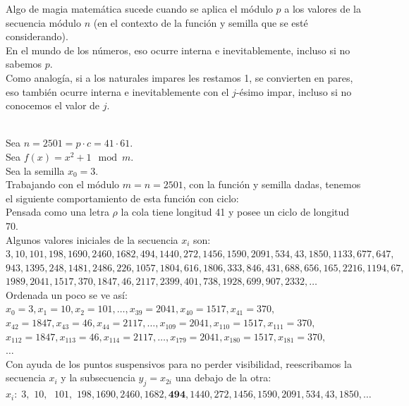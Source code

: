 Algo de magia matemática sucede cuando se aplica el módulo $p$ a los valores de la secuencia módulo $n$ (en el contexto de la función y semilla que se esté considerando). \\
En el mundo de los números, eso ocurre interna e inevitablemente, incluso si no sabemos $p$. \\
Como analogía, si a los naturales impares les restamos 1, se convierten en pares, eso también ocurre interna e inevitablemente con el $j$-ésimo impar, incluso si no conocemos el valor de $j$.

\begin{ejemplo} \, \\
Sea $n=2501=p \cdot c=41 \cdot 61$. \\
Sea $f(x) = x^2 + 1 \mod m$. \\
Sea la semilla $x_0 = 3 $. \\
Trabajando con el módulo $m=n=2501$, con la función y semilla dadas, tenemos el siguiente comportamiento de esta función con ciclo: \\
Pensada como una letra $\rho$ la cola tiene longitud 41 y posee un ciclo de longitud 70. \\
Algunos valores iniciales de la secuencia $x_i$ son: \\
$3, 10, 101, 198, 1690, 2460, 1682, 494, 1440, 272, 1456, 1590, 2091, 534, 43, 1850, 1133, 677, 647,$ \\
$943, 1395, 248, 1481, 2486, 226, 1057, 1804, 616, 1806, 333, 846, 431, 688, 656, 165, 2216, 1194, 67,$ \\
$1989, 2041, 1517, 370, 1847, 46, 2117, 2399, 401, 738, 1928, 699, 907, 2332, \dots$ \\
 Ordenada un poco se ve así: \\
$x_0 = 3, x_1= 10, x_2 = 101, \dots, x_{39} = 2041, x_{40} = 1517, x_{41} = 370,$ \\
$x_{42} = 1847, x_{43} = 46, x_{44} = 2117, \dots, x_{109} = 2041, x_{110} = 1517, x_{111} = 370,$ \\
$x_{112} = 1847, x_{113} = 46, x_{114} = 2117, \dots, x_{179} = 2041, x_{180} = 1517, x_{181} = 370, $ \\
$ \dots$ \\
Con ayuda de los puntos suspensivos para no perder visibilidad, reescribamos la secuencia $x_i$ y la subsecuencia $y_j=x_{2i}$ una debajo de la otra: \\
$x_i: \; 3, \,\,10, \,\,\;101, \,\,198, 1690, 2460, 1682, \textbf{494}, 1440, 272, 1456, 1590, 2091, 534, 43, 1850, \dots$ \\

\end{ejemplo}
